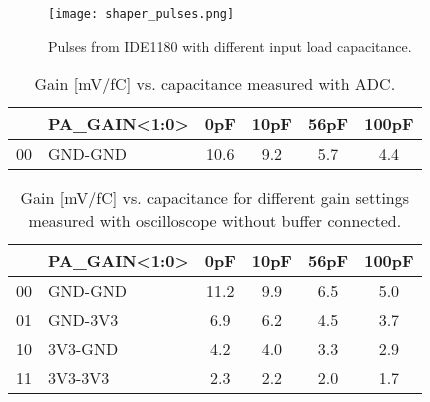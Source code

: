 \documentclass[../main/thesis.tex]{subfiles}
\begin{document}
\begin{figure}%
	\centering
	\texttt{[image: shaper\_pulses.png]}
	\caption{Pulses from IDE1180 with different input load capacitance.}
	\label{fig-gain-drop}
\end{figure} 


\begin{table}[h!]
	\begin{center}
		\caption{Gain [mV/fC] vs. capacitance measured with ADC.}
		\label{tab-gain-adc}
		\begin{tabular}{clcccc}\toprule
			&\textbf{PA\_GAIN<1:0>} & \textbf{0pF}  & \textbf{10pF} & \textbf{56pF} & \textbf{100pF} \\ \midrule
			00 &GND-GND     & 10.6 & 9.2  & 5.7  & 4.4   \\ \bottomrule
		\end{tabular}
	\end{center}
\end{table}

\begin{table}[h!] %
	\begin{center}
		\caption{Gain [mV/fC] vs. capacitance for different gain settings measured with oscilloscope without buffer connected.}
		\label{tab-gain-nobuffer}
		\begin{tabular}{clcccc}\toprule
			&\textbf{PA\_GAIN<1:0>} & \textbf{0pF}  & \textbf{10pF} & \textbf{56pF} & \textbf{100pF} \\ \midrule
			00&GND-GND     & 11.2 & 9.9 & 6.5  & 5.0   \\
			01&GND-3V3     & 6.9    & 6.2  & 4.5  & 3.7   \\
			10&3V3-GND     & 4.2  & 4.0  & 3.3  & 2.9     \\
			11&3V3-3V3     & 2.3  & 2.2  & 2.0    & 1.7 \\ \bottomrule
		\end{tabular}
	\end{center}
\end{table}
\end{document}
